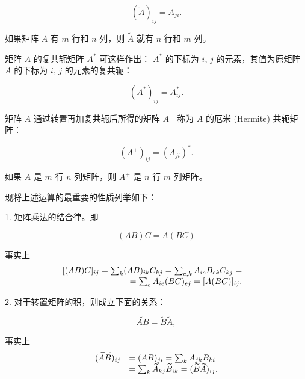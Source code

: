 \begin{equation*}
(\widetilde {A}) _ {i j} = A _ {j i}.
\end{equation*}

如果矩阵 $A$ 有 $m$ 行和 $n$ 列，则 $\widetilde{A}$ 就有 $n$ 行和 $m$ 列。

矩阵 $A$ 的复共轭矩阵 $A^{*}$ 可这样作出： $A^{*}$ 的下标为 $i$, $j$ 的元素，其值为原矩阵 $A$ 的下标为 $i$, $j$ 的元素的复共轭：

\begin{equation*}
(A ^ {*}) _ {i j} = A _ {i j} ^ {*}.
\end{equation*}

矩阵 $A$ 通过转置再加复共轭后所得的矩阵 $A^{+}$ 称为 $A$ 的厄米 (Hermite) 共轭矩阵：

\begin{equation*}
(A ^ {+}) _ {i j} = (A _ {j i}) ^ {*}.
\end{equation*}

如果 $A$ 是 $m$ 行 $n$ 列矩阵，则 $A^{+}$ 是 $n$ 行 $m$ 列矩阵。

现将上述运算的最重要的性质列举如下：

1. 矩阵乘法的结合律。即

\begin{equation*}
(A B) C = A (B C)\tag{2.7}
\end{equation*}

事实上
\begin{equation*}
\begin{array}{r l} {[ (A B) C ] _ {i j} = \sum_ {k} (A B) _ {i k} C _ {k j} = \sum_ {e, k} A _ {i e} B _ {e k} C _ {k j} =} & \\ {= \sum_ {e} A _ {i e} (B C) _ {e j} = [ A (B C) ] _ {i j}.} \end{array}
\end{equation*}

2. 对于转置矩阵的积，则成立下面的关系：

\begin{equation*}
\widetilde {A B} = \widetilde {B} \widetilde {A},\tag{2.8}
\end{equation*}

事实上
\begin{equation*}
\begin{array}{r l} (\widetilde {A B}) _ {i j} & = (A B) _ {j i} = \sum_ {k} A _ {j k} B _ {k i} \\ & = \sum_ {k} \widetilde {A} _ {k j} \widetilde {B} _ {i k} = (\widetilde {B} \widetilde {A}) _ {i j}. \end{array}
\end{equation*}

